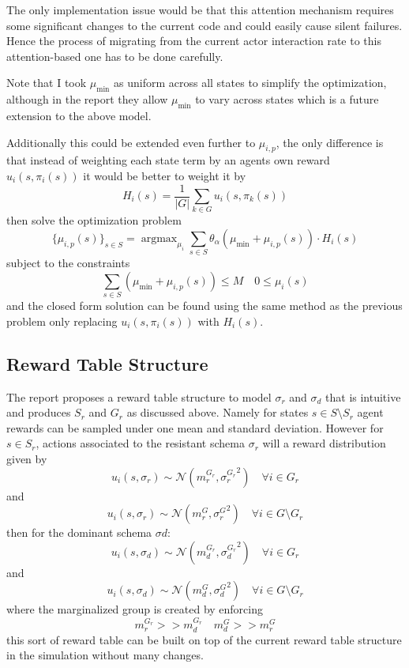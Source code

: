 \documentclass[12pt]{article}
\begin{document}
The only implementation issue would be that this attention mechanism requires some significant
changes to the current code and could easily cause silent failures. Hence the process of migrating
from the current actor interaction rate to this attention-based one has to be done carefully.

Note that I took $\mu_{\text{min}}$ as uniform across all states to simplify the optimization, although in the report they allow $\mu_{\text{min}}$ to vary across states
which is a future extension to the above model.

Additionally this could be extended even further to $\mu_{i, p}$, the only difference is that instead
of weighting each state term by an agents own reward $u_i(s, \pi_i(s))$ it would be better to weight it by
\[ H_i(s) = \frac{1}{|G|}\sum_{k \in G}u_i(s, \pi_k(s)) \]
then solve the optimization problem
\[ \{ \mu_{i, p}(s)\}_{s\in S} = \operatorname{argmax}_{\mu_i} \sum_{s \in S} \theta_\alpha(\mu_{\text{min}} + \mu_{i, p}(s))\cdot H_i(s) \]
subject to the constraints
\[ \sum_{s \in S}(\mu_{\text{min}} + \mu_{i, p}(s)) \leq M  \quad 0 \leq \mu_i(s) \]
and the closed form solution can be found using the same method as the previous problem only replacing $u_i(s, \pi_i(s))$
with $H_i(s)$.

\subsection{Reward Table Structure}
The report proposes a reward table structure to model $\sigma_r$ and $\sigma_d$ that is intuitive
and produces $S_r$ and $G_r$ as discussed above. Namely for states $s \in S \setminus S_r$
agent rewards can be sampled under one mean and standard deviation. However for $s \in S_r$,
actions associated to the resistant schema $\sigma_r$ will a reward distribution given by
\[ u_i(s, \sigma_r) \sim \mathcal N(m_r^{G_r}, {\sigma_r^{G_r}}^2) \quad \forall i \in G_r\]
and
\[ u_i(s, \sigma_r) \sim \mathcal N(m_r^{G}, {\sigma_r^{G}}^2) \quad \forall i \in G \setminus G_r\]
then for the dominant schema $\sigma d$:
\[ u_i(s, \sigma_d) \sim \mathcal N(m_d^{G_r}, {\sigma_d^{G_r}}^2) \quad \forall i \in G_r \]
and
\[ u_i(s, \sigma_d) \sim \mathcal N(m_d^{G}, {\sigma_d^{G}}^2) \quad \forall i \in G \setminus G_r\]
where the marginalized group is created by enforcing
\[ m_r^{G_r} >> m_d^{G_r}  \quad m_d^{G} >> m_r^{G} \]
this sort of reward table can be built on top of the current reward table structure in the simulation
without many changes.
\end{document}
